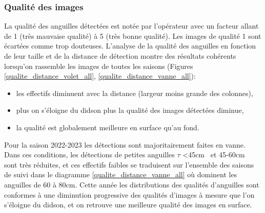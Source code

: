 \documentclass[11pt,twocolumn,titlepage,twoside]{article}
\newlength\defaultparindent
\begin{document}
\vspace{\dimexpr.8pt+\fboxsep\relax}
\noindent       
{}
\subsubsection{Qualité des images}

La qualité des anguilles détectées est notée par l'opérateur avec un facteur allant de 1 (très mauvaise qualité) à 5 (très bonne
qualité). Les images de qualité 1 sont écartées comme trop douteuses. L'analyse
de la qualité des anguilles en fonction de leur taille et de la distance de
détection montre des résultats cohérents lorsqu'on rassemble les images de
toutes les saisons (Figures \ref{qualite_distance_volet_all},
\ref{qualite_distance_vanne_all}):
\begin{itemize}
\item les effectifs diminuent avec la distance (largeur moins
grande des colonnes),  
\item plus on s'éloigne du didson plus la qualité des images détectées diminue,
\item la qualité est globalement meilleure en surface qu'au fond.
\end{itemize}
Pour la saison 2022-2023 les détections sont majoritairement faites en
vanne. Dans ces conditions, les détections de petites anguilles $\tau$
<45cm~ et 45-60cm~ sont très réduites, et ces
effectifs faibles se traduisent sur l'ensemble des saisons de suivi dans le
diagramme \ref{qualite_distance_vanne_all} où dominent les anguilles de 60 à 80cm. 
Cette année les distributions des qualités d'anguilles sont conformes à une
diminution progressive des qualités d'images à mesure que l'on s'éloigne du
didson, et on retrouve une meilleure qualité des images en surface.
\end{document}
